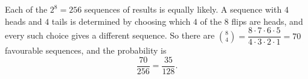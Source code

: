 Each of the $2^8=256$ sequences of results is equally likely. A sequence with $4$ heads and $4$ tails is determined by choosing which $4$ of the $8$ flips are heads, and every such choice gives a different sequence. So there are $\binom84=\dfrac{8\cdot7\cdot6\cdot5}{4\cdot3\cdot2\cdot1}=70$ favourable sequences, and the probability is
\[
\dfrac{70}{256}=\boxed{\dfrac{35}{128}}.
\]
